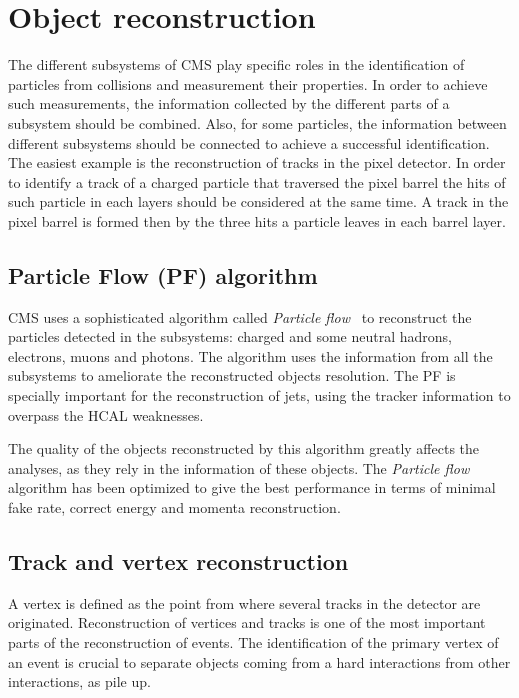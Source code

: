 \section{Object reconstruction}
\label{sec:reco}

The different subsystems of CMS play specific roles in the identification of particles from collisions and measurement their properties. In order to achieve such measurements, the information collected by the different parts of a subsystem should be combined. Also, for some particles, the information between different subsystems should be connected to achieve a successful identification. The easiest example is the reconstruction of tracks in the pixel detector. In order to identify a track of a charged particle that traversed the pixel barrel the hits of such particle in each layers should be considered at the same time. A track in the pixel barrel is formed then by the three hits a particle leaves in each barrel layer.

\subsection{Particle Flow (PF) algorithm}

CMS uses a sophisticated algorithm called \textit{Particle flow}~\cite{CMS:2009nxa,CMS:2010eua,CMS:2010byl,CMS:2010aua} to reconstruct the particles detected in the subsystems: charged and some neutral hadrons, electrons, muons and photons. The algorithm uses the information from all the subsystems to ameliorate the reconstructed objects resolution. The PF is specially important for the reconstruction of jets, using the tracker information to overpass the HCAL weaknesses. 

The quality of the objects reconstructed by this algorithm greatly affects the analyses, as they rely in the information of these objects. The \textit{Particle flow} algorithm has been optimized to give the best performance in terms of minimal fake rate, correct energy and momenta reconstruction. 

\subsection{Track and vertex reconstruction}

A vertex is defined as the point from where several tracks in the detector are originated. Reconstruction of vertices and tracks is one of the most important parts of the reconstruction of events. The identification of the primary vertex of an event is crucial to separate objects coming from a hard interactions from other interactions, as pile up. 

